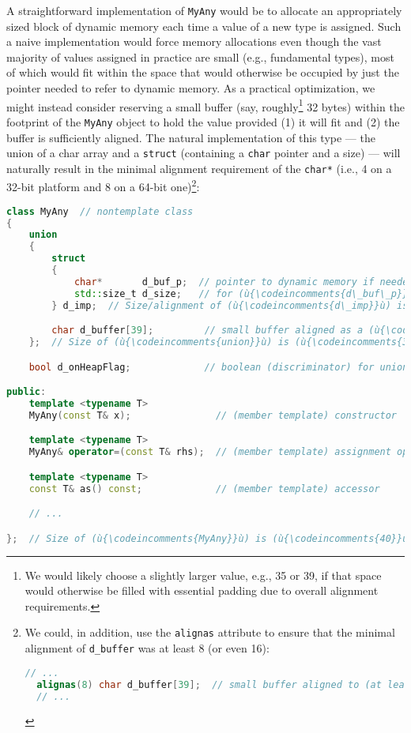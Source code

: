 \noindent A straightforward implementation of \texttt{MyAny} would be to allocate
an appropriately sized block of dynamic memory each time a value of a
new type is assigned. Such a naive implementation would force memory
allocations even though the vast majority of values assigned in practice
are small (e.g., fundamental types), most of which would fit within the
space that would otherwise be occupied by just the pointer needed to
refer to dynamic memory. As a practical optimization, we might instead
consider reserving a small buffer (say, roughly{\cprotect\footnote{We
would likely choose a slightly larger value, e.g., 35 or 39, if that
space would otherwise be filled with essential padding due to overall
  alignment requirements.}} 32 bytes) within the footprint of the
\texttt{MyAny} object to hold the value provided (1) it will fit and (2)
the buffer is sufficiently aligned. The natural implementation of this
type --- the union of a char array and a \texttt{struct} (containing a
\texttt{char} pointer and a size) --- will naturally result in the minimal
alignment requirement of the \texttt{char*} (i.e., 4 on a 32-bit
platform and 8 on a 64-bit one){\cprotect\footnote{We could, in
  addition, use the {\tt alignas} attribute to ensure that
  the minimal alignment of \texttt{d\_buffer} was at least 8 (or even
  16):

  \begin{lstlisting}[language=C++, basicstyle={\ttfamily\footnotesize}]
  // ...
  alignas(8) char d_buffer[39];  // small buffer aligned to (at least) 8
  // ...
  \end{lstlisting}
      }}:

\begin{lstlisting}[language=C++]
class MyAny  // nontemplate class
{
    union
    {
        struct
        {
            char*       d_buf_p;  // pointer to dynamic memory if needed
            std::size_t d_size;   // for (ù{\codeincomments{d\_buf\_p}}ù); same alignment as (ù{\codeincomments{(char*)}}ù)
        } d_imp;  // Size/alignment of (ù{\codeincomments{d\_imp}}ù) is (ù{\codeincomments{sizeof(d\_buf\_p)}}ù) (e.g., 4 or 8).

        char d_buffer[39];         // small buffer aligned as a (ù{\codeincomments{(char*)}}ù)
    };  // Size of (ù{\codeincomments{union}}ù) is (ù{\codeincomments{39}}ù); alignment of (ù{\codeincomments{union}}ù) is (ù{\codeincomments{alignof(char*)}}ù).

    bool d_onHeapFlag;             // boolean (discriminator) for union (above)

public:
    template <typename T>
    MyAny(const T& x);               // (member template) constructor

    template <typename T>
    MyAny& operator=(const T& rhs);  // (member template) assignment operator

    template <typename T>
    const T& as() const;             // (member template) accessor

    // ...

};  // Size of (ù{\codeincomments{MyAny}}ù) is (ù{\codeincomments{40}}ù); alignment of (ù{\codeincomments{MyAny}}ù) is (ù{\codeincomments{alignof(char*)}}ù) (e.g., 8).
\end{lstlisting}

